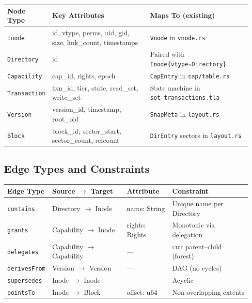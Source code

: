 \documentclass[11pt,a4paper]{article}
\theoremstyle{definition}
\newcommand{\CDT}{\textsc{cdt}}
\begin{document}
\begin{center}
\footnotesize
\begin{tabularx}{\textwidth}{l l X}
\toprule
\textbf{Node Type} & \textbf{Key Attributes} & \textbf{Maps To (existing)} \\
\midrule
\texttt{Inode} & id, vtype, perms, uid, gid, size, link\_count, timestamps & \texttt{Vnode} in \texttt{vnode.rs} \\
\texttt{Directory} & id & Paired with \texttt{Inode\{vtype=Directory\}} \\
\texttt{Capability} & cap\_id, rights, epoch & \texttt{CapEntry} in \texttt{cap/table.rs} \\
\texttt{Transaction} & txn\_id, tier, state, read\_set, write\_set & State machine in \texttt{sot\_transactions.tla} \\
\texttt{Version} & version\_id, timestamp, root\_oid & \texttt{SnapMeta} in \texttt{layout.rs} \\
\texttt{Block} & block\_id, sector\_start, sector\_count, refcount & \texttt{DirEntry} sectors in \texttt{layout.rs} \\
\bottomrule
\end{tabularx}
\end{center}

\subsection{Edge Types and Constraints}

\begin{center}
\footnotesize
\begin{tabularx}{\textwidth}{l l l X}
\toprule
\textbf{Edge Type} & \textbf{Source $\to$ Target} & \textbf{Attribute} & \textbf{Constraint} \\
\midrule
\texttt{contains} & Directory $\to$ Inode & name: String & Unique name per Directory \\
\texttt{grants} & Capability $\to$ Inode & rights: Rights & Monotonic via delegation \\
\texttt{delegates} & Capability $\to$ Capability & --- & \CDT{} parent--child (forest) \\
\texttt{derivesFrom} & Version $\to$ Version & --- & DAG (no cycles) \\
\texttt{supersedes} & Inode $\to$ Inode & --- & Acyclic \\
\texttt{pointsTo} & Inode $\to$ Block & offset: u64 & Non-overlapping extents \\
\bottomrule
\end{tabularx}
\end{center}
\end{document}
